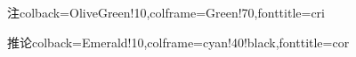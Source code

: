 %
{注}{colback=OliveGreen!10,colframe=Green!70,fonttitle=\bfseries}{cri}

%
{推论}{colback=Emerald!10,colframe=cyan!40!black,fonttitle=\bfseries}{cor}



\newcommand{\xrowht}[2][0]{\addstackgap[.5\dimexpr#2\relax]{\vphantom{#1}}}

\newcommand{\tabincell}[2]{\begin{tabular}{@{}#1@{}}#2\end{tabular}}

\newenvironment{ca}[1][1]{\linespread{#1} \selectfont \begin{cases}}{\end{cases}}
\newenvironment{vx}[1][1]{\linespread{#1} \selectfont \begin{vmatrix}}{\end{vmatrix}}

\def\d{\textup{d}} %
\def\R{\mathbb{R}} %
\newcommand{\bs}[1]{\boldsymbol{#1}}    %
\newcommand{\ora}[1]{\overrightarrow{#1}} %

\newcommand{\pll}{\kern 0.5em/\kern -0.8em /\kern 0.5em}

\newcommand{\myspace}[1]{\par\vspace{#1\baselineskip}}

